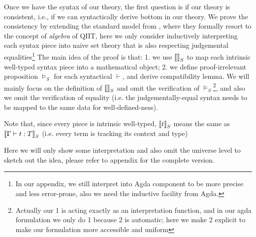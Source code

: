 Once we have the syntax of our theory, the first question is if our theory is consistent, i.e., if we can syntactically derive bottom in our theory. We prove the consistency by extending the standard model from \citep{kaposi2017type, kaposi2019gluing}, where they formally resort to the concept of \textit{algebra} of QIIT, here we only consider inductively interpreting each syntax piece into naive set theory that is also respecting judgemental equalities\footnote{In our appendix, we still interpret into Agda component to be more precise and less error-prone, also we need the inductive facility from Agda.} The main idea of the proof is that: 1. we use ${{\llbracket {} \rrbracket}_S}$ to map each intrinsic well-typed syntax piece into a mathematical object; 2. we define proof-irrelevant proposition $\models_S$ for each syntactical $\vdash$, and derive compatibility lemma. We will mainly focus on the definition of ${{\llbracket {} \rrbracket}_S}$ and omit the verification of $\models_S$\footnote{Actually our 1 is acting exactly as an interpretation function, and in our agda formulation we only do 1 because 2 is automatic; here we make 2 explicit to make our formulation more accessible and uniform}, and also we omit the verification of equality (i.e. the judgementally-equal syntax needs to be mapped to the same data for well-defined-ness).

Note that, since every piece is intrinsic well-typed, ${{\llbracket {t} \rrbracket}_S}$ means the same as ${{\llbracket {{ {\Gamma} \vdash {t} : {T} }} \rrbracket}_S}$ (i.e. every term is tracking its context and type)

Here we will only show some interpretation and also omit the universe level to sketch out the idea, please refer to appendix for the complete version. 

\newcommand{\goodCtxS}[2]{{ {#1} \ \models_S }}
\newcommand{\goodTypeS}[3]{{ {#1} \models_S {#2} }}
\newcommand{\goodTermS}[3]{{ {#1} \models_S {#2} : {#3} }}
\newcommand{\goodSubS}[3]{{ {#1} \models_S {#2} : {#3} }}
\newcommand{\goodSigS}[3]{{ {#1} \models_S {#2} \ \  Sig^{#3} }}
\newcommand{\goodWSigS}[3]{{ {#1} \models_S {#2} \ \ WSig^{#3} }}
\newcommand{\goodSealS}[4]{{ {#1} \models_S {#2} : {#3} \  |\  {#4} }}
\newcommand{\goodInhS}[4]{{ {#1} \models_S {#2} : {#3} \twoheadrightarrow {#4}}}

